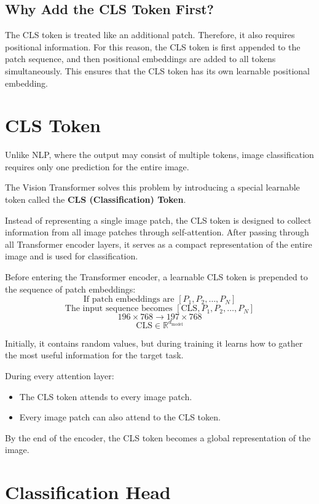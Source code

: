 \subsection{Why Add the CLS Token First?}

The CLS token is treated like an additional patch. Therefore, it also requires positional information. For this reason, the CLS token is first appended to the patch sequence, and then positional embeddings are added to all tokens simultaneously. This ensures that the CLS token has its own learnable positional embedding.


\section{CLS Token}

Unlike NLP, where the output may consist of multiple tokens, image classification requires only one prediction for the entire image.

The Vision Transformer solves this problem by introducing a special learnable token called the \textbf{CLS (Classification) Token}.

Instead of representing a single image patch, the CLS token is designed to collect information from all image patches through self-attention. After passing through all Transformer encoder layers, it serves as a compact representation of the entire image and is used for classification.

Before entering the Transformer encoder, a learnable CLS token is prepended to the sequence of patch embeddings:
\[
\text{If patch embeddings are } [P_1, P_2, \dots, P_N]
\]
\[
\text{The input sequence becomes } [\text{CLS}, P_1, P_2, \dots, P_N]
\]
\[
196 \times 768 \longrightarrow 197 \times 768
\]
\[
\text{CLS} \in \mathbb{R}^{d_{\text{model}}}
\]

Initially, it contains random values, but during training it learns how to gather the most useful information for the target task.

During every attention layer:
\begin{itemize}
    \item The CLS token attends to every image patch.
    \item Every image patch can also attend to the CLS token.
\end{itemize}

By the end of the encoder, the CLS token becomes a global representation of the image.


\section{Classification Head}

